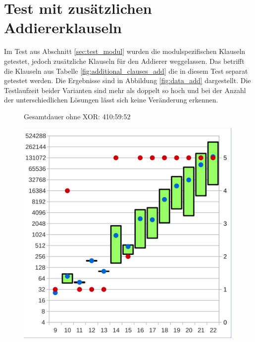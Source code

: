 \section{Test mit zusätzlichen Addiererklauseln} %
\label{sec:test_234}

Im Test aus Abschnitt \ref{sec:test_modul} wurden die modulspezifischen Klauseln getestet, jedoch zusätzliche Klauseln für den Addierer weggelassen.
Das betrifft die Klauseln aus Tabelle \ref{fig:additional_clauses_add} die in diesem Test separat getestet werden.
Die Ergebnisse sind in Abbildung \ref{fig:data_add} dargestellt. Die Testlaufzeit beider Varianten sind mehr als doppelt so hoch und bei der
Anzahl der unterschiedlichen Lösungen lässt sich keine Veränderung erkennen.
\begin{figure}[!h]
  \centering
  \begin{minipage}[c]{0.45\textwidth}
  \begin{flushleft}Gesamtdauer ohne XOR: 410:59:52\end{flushleft}
  \includegraphics[scale=0.55]{images/data_add_knf}
  \end{minipage}
  \begin{minipage}[c]{0.09\textwidth}
  ~~
  \end{minipage}
  \begin{minipage}[c]{0.45\textwidth}

\end{minipage}
\end{figure}
